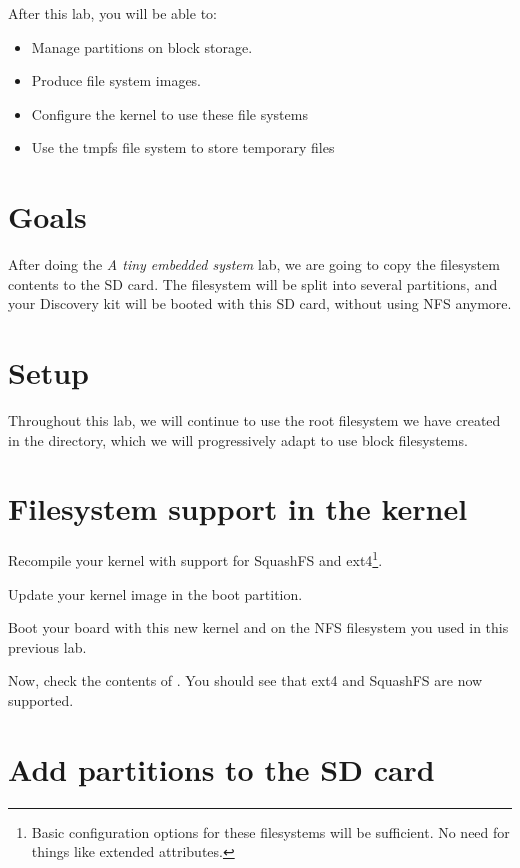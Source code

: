 
After this lab, you will be able to:
\begin{itemize}
\item Manage partitions on block storage.
\item Produce file system images.
\item Configure the kernel to use these file systems
\item Use the tmpfs file system to store temporary files
\end{itemize}

\section{Goals}

After doing the {\em A tiny embedded system} lab, we are going to copy
the filesystem contents to the SD card. The filesystem will be
split into several partitions, and your Discovery kit will be booted
with this SD card, without using NFS anymore.

\section{Setup}

Throughout this lab, we will continue to use the root filesystem we
have created in the 
directory, which we will progressively adapt to use block filesystems.

\section{Filesystem support in the kernel}

Recompile your kernel with support for SquashFS and ext4\footnote{Basic
configuration options for these filesystems will be sufficient. No need
for things like extended attributes.}.

Update your kernel image in the boot partition.

Boot your board with this new kernel and on the NFS filesystem you
used in this previous lab.

Now, check the contents of . You should see
 that ext4 and SquashFS are now supported.

\section{Add partitions to the SD card}

